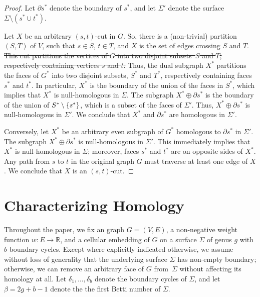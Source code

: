 \documentclass[letterpaper,review]{siamart190516}
\def\Real{\mathbb{R}}
\def\Cut{X}
\def\modified#1{\color{blue}#1 \color{black}}
\begin{document}
\begin{proof}
Let $\partial s^*$ denote the boundary of $s^*$, and let $\Sigma'$ denote the surface $\Sigma\setminus {(s^*\cup t^*)}$.

Let $\Cut$ be an arbitrary $(s,t)$-cut in $G$.  \modified{So, there is a (non-trivial) partition $(S,T)$ of $V$, such that $s\in S$, $t\in T$, and $\Cut$ is the set of edges crossing $S$ and $T$.}
\sout{This cut partitions the vertices of $G$ into two disjoint subsets~$S$ and $T$, respectively containing vertices $s$ and $t$.}  Thus, the dual subgraph $\Cut^*$ partitions the faces of $G^*$ into two disjoint subsets, $S^*$ and $T^*$, respectively containing faces $s^*$ and $t^*$.  In particular, $\Cut^*$ is the boundary of the union of the faces in $S^*$, which implies that $\Cut^*$ is null-homologous in $\Sigma$.  The subgraph $\Cut^* \oplus \partial s^*$ is the boundary of the union of $S^* \setminus\{ s^* \}$, which is a subset of the faces of $\Sigma'$.  Thus, $\Cut^*\oplus \partial s^*$ is null-homologous in $\Sigma'$.  We conclude that $\Cut^*$ and  $\partial s^*$ are homologous in $\Sigma'$.

Conversely, let $\Cut^*$ be an arbitrary even subgraph of $G^*$ homologous to $\partial s^*$ in $\Sigma'$.  The subgraph $\Cut^*\oplus \partial s^*$ is null-homologous in $\Sigma'$.  This immediately implies that $X^*$ is null-homologous in $\Sigma$; moreover, faces $s^*$ and $t^*$ are on opposite sides of $X^*$.  Any path from $s$ to $t$ in the original graph $G$ must traverse at least one edge of $\Cut$.  We conclude that $\Cut$ is an $(s,t)$-cut.
\end{proof}


\section{Characterizing Homology}
\label{S:tree-cotree}

Throughout the paper, we fix an  graph $G=(V,E)$, a non-negative weight function $w\colon E\to \Real$, and a cellular embedding of $G$ on a surface $\Sigma$ of genus $g$ with $b$ boundary cycles.
Except where explicitly indicated otherwise, we assume without loss of generality  that the underlying surface $\Sigma$ has non-empty boundary; otherwise, we can remove an arbitrary face of $G$ from~$\Sigma$ without affecting its homology at all.  Let $\delta_1, \dots, \delta_b$ denote the boundary cycles of $\Sigma$, and let $\beta = 2g+b-1$ denote the the first Betti number of $\Sigma$.
\end{document}
